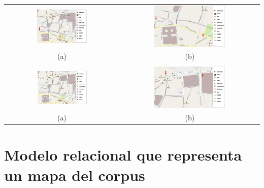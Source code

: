 \begin{center}
\begin{tabular}{c c}
\includegraphics[width=0.46\textwidth]{images/corpus/mapa11.png} & \includegraphics[width=0.53\textwidth]{images/corpus/falta.png} \\
(a) & (b) \\
& \\
\includegraphics[width=0.46\textwidth]{images/corpus/mapa12.png} & \includegraphics[width=0.53\textwidth]{images/corpus/falta2.png} \\
(a) & (b) \\
\end{tabular}
\end{center}




\clearpage
\section{Modelo relacional que representa un mapa del corpus}

